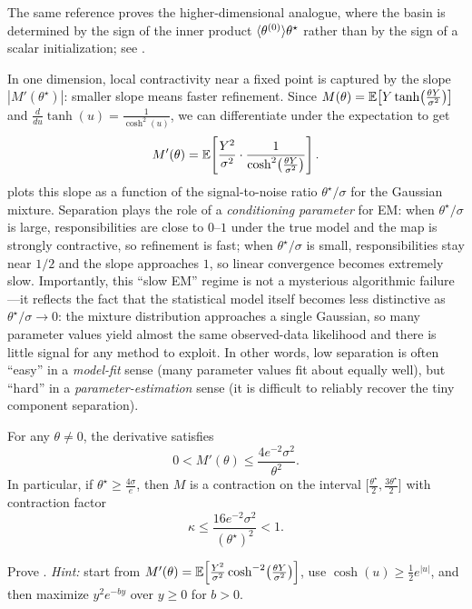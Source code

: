 \documentclass[11pt]{article}
\begin{document}
The same reference proves the higher-dimensional analogue, where the basin is determined by the sign of the inner product $\langle\theta^{(0)}\rangle{\theta^\star}$ rather than by the sign of a scalar initialization; see \citet[Thms.~1--2]{xu_hsu_maleki_2016_global_em}.

In one dimension, local contractivity near a fixed point is captured by the slope $|M'(\theta^\star)|$: smaller slope means faster refinement.
Since $M(\theta)=\mathbb{E}\!\left[Y\tanh\!\left(\frac{\theta Y}{\sigma^2}\right)\right]$ and $\frac{d}{du}\tanh(u)=\frac{1}{\cosh^2(u)}$, we can differentiate under the expectation to get
\[
M'(\theta)
=
\mathbb{E}\!\left[\frac{Y^2}{\sigma^2}\cdot \frac{1}{\cosh^2\!\left(\frac{\theta Y}{\sigma^2}\right)}\right].
\]
 plots this slope as a function of the signal-to-noise ratio $\theta^\star/\sigma$ for the Gaussian mixture.
Separation plays the role of a \emph{conditioning parameter} for EM: when $\theta^\star/\sigma$ is large, responsibilities are close to $0$--$1$ under the true model and the map is strongly contractive, so refinement is fast; when $\theta^\star/\sigma$ is small, responsibilities stay near $1/2$ and the slope approaches $1$, so linear convergence becomes extremely slow.
Importantly, this ``slow EM'' regime is not a mysterious algorithmic failure---it reflects the fact that the statistical model itself becomes less distinctive as $\theta^\star/\sigma\to 0$:
the mixture distribution approaches a single Gaussian, so many parameter values yield almost the same observed-data likelihood and there is little signal for any method to exploit.
In other words, low separation is often ``easy'' in a \emph{model-fit} sense (many parameter values fit about equally well), but ``hard'' in a \emph{parameter-estimation} sense (it is difficult to reliably recover the tiny component separation).

\begin{lemma}
\label{lem:gmm-contractive-region}
For any $\theta\neq 0$, the derivative satisfies
\[
0< M'(\theta) \le \frac{4e^{-2}\sigma^2}{\theta^2}.
\]
In particular, if $\theta^\star \ge \frac{4\sigma}{e}$, then $M$ is a contraction on the interval $\big[\frac{\theta^\star}{2},\frac{3\theta^\star}{2}\big]$ with contraction factor
\[
\kappa \le \frac{16e^{-2}\sigma^2}{(\theta^\star)^2} < 1.
\]
\end{lemma}

\clearpage
\begin{exercise}
\label{ex:gmm-contractive-region}
Prove .
\emph{Hint:} start from $M'(\theta)=\mathbb{E}\!\left[\frac{Y^2}{\sigma^2}\cosh^{-2}\!\left(\frac{\theta Y}{\sigma^2}\right)\right]$,
use $\cosh(u)\ge \tfrac12 e^{|u|}$, and then maximize $y^2e^{-by}$ over $y\ge 0$ for $b>0$.
\end{exercise}
\end{document}
